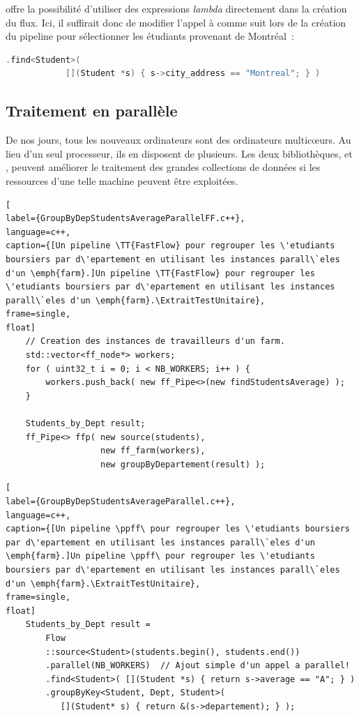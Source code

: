 offre la possibilit\'e d'utiliser des expressions \emph{lambda} directement dans la cr\'eation du flux.
%
Ici, il suffirait donc de modifier l'appel à  comme suit lors de la création du pipeline pour sélectionner les étudiants provenant de Montréal~: 
{
\begin{lstlisting}[language=c++]
		.find<Student>( 
			[](Student *s) { s->city_address == "Montreal"; } )
\end{lstlisting}
}


\subsection*{Traitement en parall\`ele}

De nos jours, tous les nouveaux ordinateurs sont des ordinateurs multicœurs. Au lieu d'un seul processeur, ils en disposent de plusieurs. Les deux biblioth\`eques,  et , peuvent am\'eliorer le traitement des grandes collections de donn\'ees si les ressources d'une telle machine peuvent être exploitées. 

\begin{lstlisting}[
label={GroupByDepStudentsAverageParallelFF.c++},
language=c++,
caption={[Un pipeline \TT{FastFlow} pour regrouper les \'etudiants boursiers par d\'epartement en utilisant les instances parall\`eles d'un \emph{farm}.]Un pipeline \TT{FastFlow} pour regrouper les \'etudiants boursiers par d\'epartement en utilisant les instances parall\`eles d'un \emph{farm}.\ExtraitTestUnitaire},
frame=single,
float]
	// Creation des instances de travailleurs d'un farm.
	std::vector<ff_node*> workers;
	for ( uint32_t i = 0; i < NB_WORKERS; i++ ) {
		workers.push_back( new ff_Pipe<>(new findStudentsAverage) );
	}

	Students_by_Dept result;
	ff_Pipe<> ffp( new source(students),
				   new ff_farm(workers),
				   new groupByDepartement(result) );     
\end{lstlisting}

\begin{lstlisting}[
label={GroupByDepStudentsAverageParallel.c++},
language=c++,
caption={[Un pipeline \ppff\ pour regrouper les \'etudiants boursiers par d\'epartement en utilisant les instances parall\`eles d'un \emph{farm}.]Un pipeline \ppff\ pour regrouper les \'etudiants boursiers par d\'epartement en utilisant les instances parall\`eles d'un \emph{farm}.\ExtraitTestUnitaire},
frame=single,
float]
    Students_by_Dept result = 
        Flow
        ::source<Student>(students.begin(), students.end())
        .parallel(NB_WORKERS)  // Ajout simple d'un appel a parallel!
        .find<Student>( [](Student *s) { return s->average == "A"; } )
        .groupByKey<Student, Dept, Student>(
           [](Student* s) { return &(s->departement); } );
\end{lstlisting}

